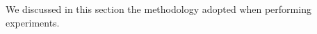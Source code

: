 \label{sec:setup}
We discussed in this section the methodology adopted when performing experiments. 






%
%
%
%
%
%
%
%
%
%
%  







